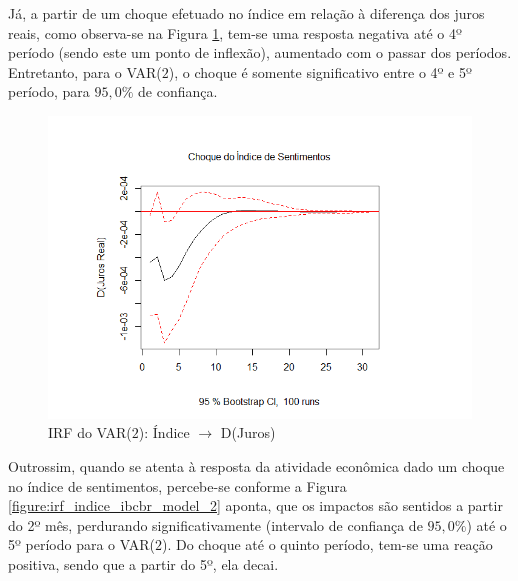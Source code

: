 Já, a partir de um choque efetuado no índice em relação à diferença dos juros reais, como observa-se na Figura \ref{figure:irf_indice_selic_model_2}, tem-se uma resposta negativa até o 4º período (sendo este um ponto de inflexão), aumentado com o passar dos períodos. Entretanto, para o VAR($2$), o choque é somente significativo entre o 4º e 5º período, para $95,0\%$ de confiança.

\begin{figure}[hbtp]
	\centering
	\caption{IRF do VAR($2$): Índice $\rightarrow$ D(Juros)} \label{figure:irf_indice_selic_model_2}
	\includegraphics[scale = 0.60]{figuras/irf_indice_selic_model_2.PNG}
\end{figure}

Outrossim, quando se atenta à resposta da atividade econômica dado um choque no índice de sentimentos, percebe-se conforme a Figura  \ref{figure:irf_indice_ibcbr_model_2} aponta, que os impactos são sentidos a partir do 2º mês, perdurando significativamente (intervalo de confiança de $95,0\%$) até o 5º período para o VAR($2$). Do choque até o quinto período, tem-se uma reação positiva, sendo que a partir do 5º, ela decai.

